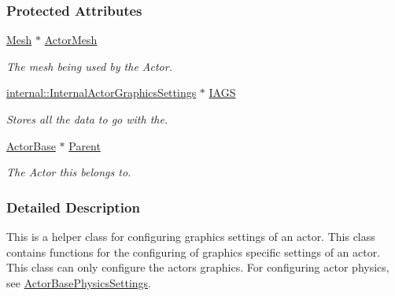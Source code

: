 \subsubsection*{Protected Attributes}
\begin{DoxyCompactItemize}
\item 
\hypertarget{classphys_1_1ActorGraphicsSettings_a430d5a0b171409125491dcb66ee4580b}{
\hyperlink{classphys_1_1Mesh}{Mesh} $\ast$ \hyperlink{classphys_1_1ActorGraphicsSettings_a430d5a0b171409125491dcb66ee4580b}{ActorMesh}}
\label{classphys_1_1ActorGraphicsSettings_a430d5a0b171409125491dcb66ee4580b}

\begin{DoxyCompactList}\small\item\em The mesh being used by the Actor. \item\end{DoxyCompactList}\item 
\hypertarget{classphys_1_1ActorGraphicsSettings_afc038a8da65483f028f799fb80f62848}{
\hyperlink{classphys_1_1internal_1_1InternalActorGraphicsSettings}{internal::InternalActorGraphicsSettings} $\ast$ \hyperlink{classphys_1_1ActorGraphicsSettings_afc038a8da65483f028f799fb80f62848}{IAGS}}
\label{classphys_1_1ActorGraphicsSettings_afc038a8da65483f028f799fb80f62848}

\begin{DoxyCompactList}\small\item\em Stores all the data to go with the. \item\end{DoxyCompactList}\item 
\hypertarget{classphys_1_1ActorGraphicsSettings_a52f1d57929101944767bf23b003f0975}{
\hyperlink{classphys_1_1ActorBase}{ActorBase} $\ast$ \hyperlink{classphys_1_1ActorGraphicsSettings_a52f1d57929101944767bf23b003f0975}{Parent}}
\label{classphys_1_1ActorGraphicsSettings_a52f1d57929101944767bf23b003f0975}

\begin{DoxyCompactList}\small\item\em The Actor this belongs to. \item\end{DoxyCompactList}\end{DoxyCompactItemize}


\subsubsection{Detailed Description}
This is a helper class for configuring graphics settings of an actor. This class contains functions for the configuring of graphics specific settings of an actor. This class can only configure the actors graphics. For configuring actor physics, see \hyperlink{classphys_1_1ActorBasePhysicsSettings}{ActorBasePhysicsSettings}. 

